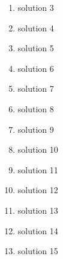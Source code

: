 \begin{eocsolutions}{}
{\begin{enumerate}[itemsep=5pt, label=\textbf{\arabic*}. ]
    \begin{enumerate}[itemsep=1pt, label=\textbf{(\alph*)} ]
\item $cos~\alpha = \frac{x}{r} = \frac{-3}{\sqrt{34}}$%
    \item $tan^2\alpha - sec^2\alpha \\
=\left(\frac{y}{x}\right)^2 - \left(\frac{r}{x}\right)^2\\
=\left(\frac{5}{-3}\right)^2 - \left(\frac{\sqrt{34}}{-3}\right)^2\\
=\frac{25}{9} - \frac{34}{9}\\
= \frac{-9}{9}\\
=-1$%
    \end{enumerate}

\item solution 3
\item solution 4
\item solution 5
\item solution 6
\item solution 7
\item solution 8
\item solution 9
\item solution 10
\item solution 11
\item solution 12
\item solution 13
\item solution 14
\item solution 15

\end{enumerate}}
\end{eocsolutions}


